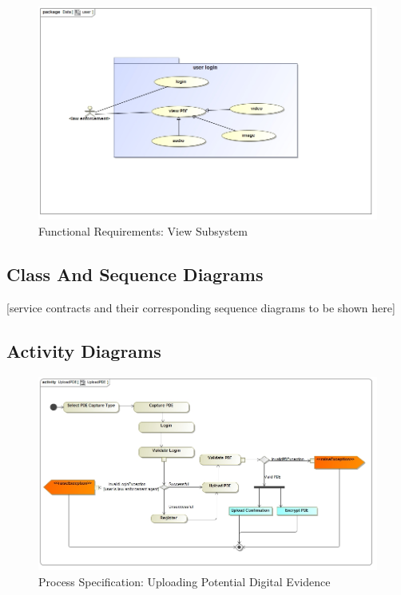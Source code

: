 \documentclass[a4paper,12pt]{article}
\begin{document}
\begin{figure}[H]
\includegraphics[width=1.0\textwidth]{images/user.jpg}
\caption{Functional Requirements: View Subsystem \label{overflow}}
\end{figure}

\subsection{Class And Sequence Diagrams}
[service contracts and their corresponding sequence diagrams to be shown here]

\subsection{Activity Diagrams}
\begin{figure}[H]
\includegraphics[width=\textwidth]{images/UploadPDE.jpg}
\caption{Process Specification: Uploading Potential Digital Evidence \label{overflow}}
\end{figure}
\end{document}
